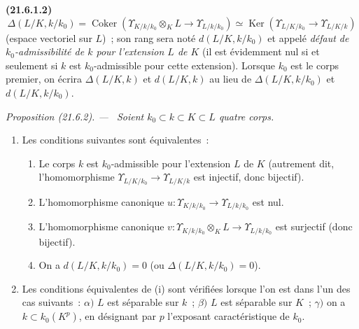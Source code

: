 \documentclass[10pt,oneside]{book}
\makeatletter
\newcommand{\setmanualcurrentlabel}[1]{\def\@currentlabel{#1}}
\newenvironment{env}[1][]{\setmanualcurrentlabel{#1}\par\medskip\noindent\textbf{(#1)}\ }{\par}
\newenvironment{proposition}[1][]{%
  \setmanualcurrentlabel{#1}\par\medskip\noindent\itshape Proposition (#1). ---\ }{\par}
\makeatother
\begin{document}
\begin{env}[21.6.1.2]
\label{0.21.6.1.2-fr}
\[
\Delta(L/K,k/k_0)=\operatorname{Coker}
(\Upsilon_{K/k/k_0}\otimes_KL\to\Upsilon_{L/k/k_0})
\simeq\operatorname{Ker}(\Upsilon_{L/K/k_0}\to\Upsilon_{L/K/k})
\]
(espace vectoriel sur $L$)~; son rang sera noté $d(L/K,k/k_0)$ et appelé
\emph{défaut de $k_0$-admissibilité de $k$ pour l'extension $L$ de $K$}
(il est évidemment nul si et seulement si $k$ est $k_0$-admissible pour cette
extension). Lorsque $k_0$ est le corps premier, on écrira
$\Delta(L/K,k)$ et $d(L/K,k)$ au lieu de $\Delta(L/K,k/k_0)$ et
$d(L/K,k/k_0)$.
\end{env}

\begin{proposition}[21.6.2]
\label{0.21.6.2-fr}
Soient $k_0\subset k\subset K\subset L$ quatre corps.
\begin{enumerate}
  \item[\rm (i)] Les conditions suivantes sont équivalentes~:
  \begin{enumerate}
    \item[\rm a)] Le corps $k$ est $k_0$-admissible pour l'extension $L$ de $K$
    (autrement dit, l'homomorphisme $\Upsilon_{L/K/k_0}\to
    \Upsilon_{L/K/k}$ est injectif, donc bijectif).
    \item[\rm b)] L'homomorphisme canonique
    $u:\Upsilon_{K/k/k_0}\to\Upsilon_{L/k/k_0}$ est nul.
    \item[\rm c)] L'homomorphisme canonique
    $v:\Upsilon_{K/k/k_0}\otimes_KL\to\Upsilon_{L/k/k_0}$ est surjectif
    (donc bijectif).
    \item[\rm d)] On a $d(L/K,k/k_0)=0$ (ou
    $\Delta(L/K,k/k_0)=0$).
  \end{enumerate}
  \item[\rm (ii)] Les conditions équivalentes de (i) sont vérifiées lorsque
  l'on est dans l'un des cas suivants~: $\alpha)$ $L$ est séparable sur $k$~;
  $\beta)$ $L$ est séparable sur $K$~; $\gamma)$ on a
  $k\subset k_0(K^p)$, en désignant par $p$ l'exposant caractéristique de $k_0$.
\end{enumerate}
\end{proposition}
\end{document}
